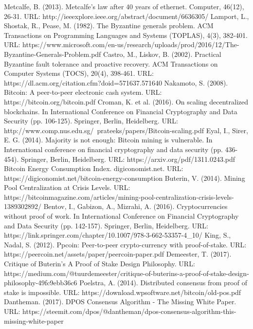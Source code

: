 \documentclass[a4paper,12pt]{article}
\begin{document}
\begin{thebibliography}{99}
  Metcalfe, B. (2013). Metcalfe's law after 40 years of ethernet. Computer, 46(12), 26-31. URL: http://ieeexplore.ieee.org/abstract/document/6636305/
  Lamport, L., Shostak, R., Pease, M. (1982). The Byzantine generals problem. ACM Transactions on Programming Languages and Systems (TOPLAS), 4(3), 382-401. URL: https://www.microsoft.com/en-us/research/uploads/prod/2016/12/The-Byzantine-Generals-Problem.pdf
  Castro, M., Liskov, B. (2002). Practical Byzantine fault tolerance and proactive recovery. ACM Transactions on Computer Systems (TOCS), 20(4), 398-461. URL: https://dl.acm.org/citation.cfm?doid=571637.571640
  Nakamoto, S. (2008). Bitcoin: A peer-to-peer electronic cash system. URL: https://bitcoin.org/bitcoin.pdf
  Croman, K. et al. (2016). On scaling decentralized blockchains. In International Conference on Financial Cryptography and Data Security (pp. 106-125). Springer, Berlin, Heidelberg. URL: http://www.comp.nus.edu.sg/~prateeks/papers/Bitcoin-scaling.pdf
  Eyal, I., Sirer, E. G. (2014). Majority is not enough: Bitcoin mining is vulnerable. In International conference on financial cryptography and data security (pp. 436-454). Springer, Berlin, Heidelberg. URL: https://arxiv.org/pdf/1311.0243.pdf
  Bitcoin Energy Consumption Index. digiconomist.net. URL: https://digiconomist.net/bitcoin-energy-consumption
  Buterin, V. (2014). Mining Pool Centralization at Crisis Levels. URL: https://bitcoinmagazine.com/articles/mining-pool-centralization-crisis-levels-1389302892/
  Bentov, I., Gabizon, A., Mizrahi, A. (2016). Cryptocurrencies without proof of work. In International Conference on Financial Cryptography and Data Security (pp. 142-157). Springer, Berlin, Heidelberg. URL: https://link.springer.com/chapter/10.1007/978-3-662-53357-4\_10/
  King, S., Nadal, S. (2012). Ppcoin: Peer-to-peer crypto-currency with proof-of-stake. URL: https://peercoin.net/assets/paper/peercoin-paper.pdf
  Demeester, T. (2017). Critique of Buterin’s A Proof of Stake Design Philosophy. URL: https://medium.com/@tuurdemeester/critique-of-buterins-a-proof-of-stake-design-philosophy-49fc9ebb36c6
  Poelstra, A. (2014). Distributed consensus from proof of stake is impossible. URL: https://download.wpsoftware.net/bitcoin/old-pos.pdf
  Dantheman. (2017). DPOS Consensus Algorithm - The Missing White Paper. URL: https://steemit.com/dpos/@dantheman/dpos-consensus-algorithm-this-missing-white-paper

\end{thebibliography}
\end{document}

